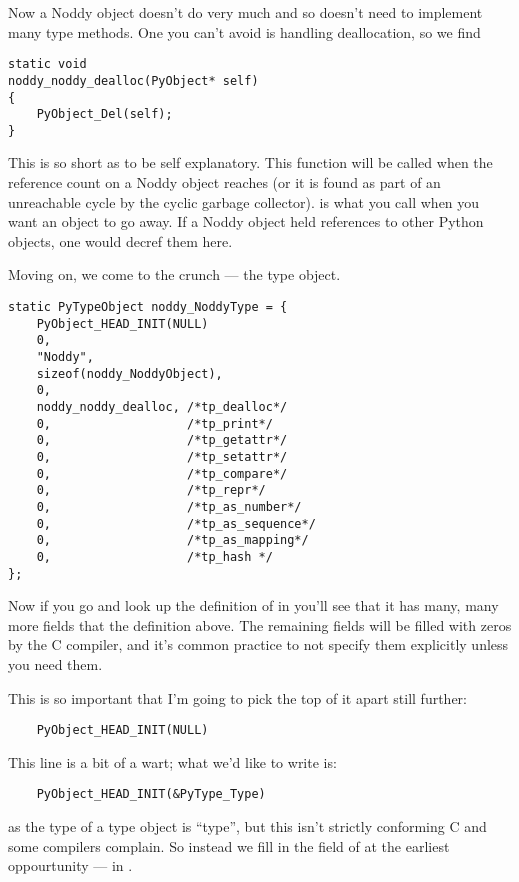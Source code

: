 Now a Noddy object doesn't do very much and so doesn't need to
implement many type methods.  One you can't avoid is handling
deallocation, so we find

\begin{verbatim}
static void
noddy_noddy_dealloc(PyObject* self)
{
    PyObject_Del(self);
}
\end{verbatim}

This is so short as to be self explanatory.  This function will be
called when the reference count on a Noddy object reaches  (or
it is found as part of an unreachable cycle by the cyclic garbage
collector).   is what you call when you want
an object to go away.  If a Noddy object held references to other
Python objects, one would decref them here.

Moving on, we come to the crunch --- the type object.

\begin{verbatim}
static PyTypeObject noddy_NoddyType = {
    PyObject_HEAD_INIT(NULL)
    0,
    "Noddy",
    sizeof(noddy_NoddyObject),
    0,
    noddy_noddy_dealloc, /*tp_dealloc*/
    0,                   /*tp_print*/
    0,                   /*tp_getattr*/
    0,                   /*tp_setattr*/
    0,                   /*tp_compare*/
    0,                   /*tp_repr*/
    0,                   /*tp_as_number*/
    0,                   /*tp_as_sequence*/
    0,                   /*tp_as_mapping*/
    0,                   /*tp_hash */
};
\end{verbatim}

Now if you go and look up the definition of  in
 you'll see that it has many, many more fields that the
definition above.  The remaining fields will be filled with zeros by
the C compiler, and it's common practice to not specify them
explicitly unless you need them.  

This is so important that I'm going to pick the top of it apart still
further:

\begin{verbatim}
    PyObject_HEAD_INIT(NULL)
\end{verbatim}

This line is a bit of a wart; what we'd like to write is:

\begin{verbatim}
    PyObject_HEAD_INIT(&PyType_Type)
\end{verbatim}

as the type of a type object is ``type'', but this isn't strictly
conforming C and some compilers complain.  So instead we fill in the
 field of  at the earliest
oppourtunity --- in .

